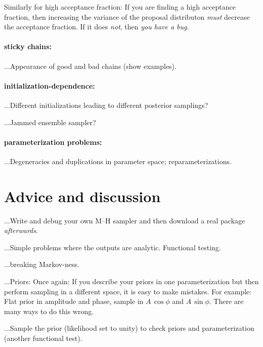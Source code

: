 \documentclass[12pt,twoside,pdftex]{article}
\begin{document}
Similarly for high acceptance fraction:
If you are finding a high acceptance fraction,
  then increasing the variance of the proposal distributon \emph{must} decrease the acceptance fraction.
If it does \emph{not}, then \emph{you have a bug}.

\paragraph{sticky chains:}
...Appearance of good and bad chains (show examples).

\paragraph{initialization-dependence:}
...Different initializations leading to different posterior samplings?

...Jammed ensemble sampler?

\paragraph{parameterization problems:}
...Degeneracies and duplications in parameter space; reparameterizations.

\section{Advice and discussion}

...Write and debug your own M--H sampler and then download a real
package \emph{afterwards}.

...Simple problems where the outputs are analytic.  Functional testing.

...breaking Markov-ness.

...Priors: Once again:
If you describe your priors in one parameterization but
then perform sampling in a different space, it is easy to make
mistakes.  For example: Flat prior in amplitude and phase, sample in
$A\,\cos\phi$ and $A\,\sin\phi$.  There are many ways to do this
wrong.

...Sample the prior (likelihood set to unity) to check priors and parameterization (another functional test).
\end{document}
